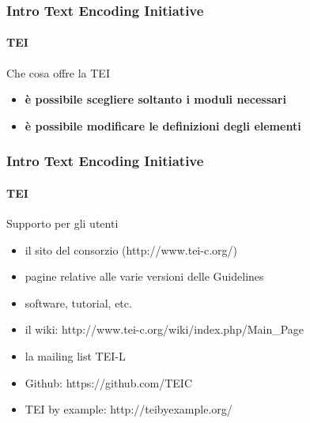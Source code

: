 \begin{frame}
	\frametitle{Intro Text Encoding Initiative}
	\framesubtitle{TEI}
	\addtocounter{nframe}{1}

	\begin{block}{Che cosa offre la TEI}
		\begin{itemize}
			\item \textbf{è possibile scegliere soltanto i moduli necessari}
			\item \textbf{è possibile modificare le definizioni degli elementi}
		\end{itemize}

	\end{block}

\end{frame}



\begin{frame}
	\frametitle{Intro Text Encoding Initiative}
	\framesubtitle{TEI}
	\addtocounter{nframe}{1}

	\begin{block}{Supporto per gli utenti}
		\begin{itemize}
			\item il sito del consorzio (http://www.tei-c.org/)
			\item pagine relative alle varie versioni delle Guidelines
			\item software, tutorial, etc.
			\item il wiki: http://www.tei-c.org/wiki/index.php/Main_Page
			\item la mailing list TEI-L
			\item Github: https://github.com/TEIC
			\item TEI by example: http://teibyexample.org/
		\end{itemize}

	\end{block}

\end{frame}



